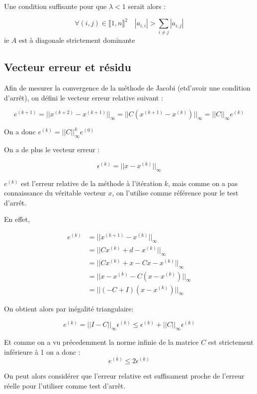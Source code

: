 \documentclass[11pt, a4paper]{article}
\begin{document}
Une condition suffisante pour que $\lambda < 1$ serait alors :

\[
\forall (i,j) \in \llbracket 1,n \rrbracket^2 \quad |a_{i,i}| > \sum_{i \neq j}|a_{i,j}|
\]
ie $A$ est à diagonale strictement dominante

\newpage 

\subsection{Vecteur erreur et résidu}

Afin de mesurer la convergence de la méthode de Jacobi (etd'avoir une condition d'arr\^et), on défini le vecteur erreur relative suivant :

\[
e^{(k+1)} = ||x^{(k+2)} - x^{(k+1)}||_{\infty} = ||C(x^{(k+1)} - x^{(k)})||_{\infty} = ||C||_{\infty}e^{(k)}
\]

On a donc $e^{(k)} = ||C||_{\infty}^ke^{(0)}$

On a de plus le vecteur erreur :

\[
\epsilon^{(k)} = ||x - x^{(k)}||_{\infty}
\]

$e^{(k)}$ est l'erreur relative de la méthode à l'itération $k$, mais comme on a pas connaissance du véritable vecteur $x$, on l'utilise comme référence pour le test d'arr\^et.

En effet, 

\begin{align*}
    e^{(k)} &= ||x^{(k+1)} - x^{(k)}||_{\infty}\\
    &= ||Cx^{(k)} + d - x^{(k)}||_{\infty}\\
    &= ||Cx^{(k)} + x - Cx - x^{(k)}||_{\infty}\\
    &= ||x - x^{(k)} - C(x - x^{(k)})||_{\infty}\\
    &= ||(-C + I)(x - x^{(k)})||_{\infty}
\end{align*}

On obtient alors par inégalité triangulaire: 

\[
e^{(k)} = ||I - C||_{\infty}\epsilon^{(k)} \leq \epsilon^{(k)} + ||C||_{\infty}\epsilon^{(k)}
\]

Et comme on a vu précedemment la norme infinie de la matrice $C$ est strictement inférieure à 1 on a donc :
\[
e^{(k)} \leq 2\epsilon^{(k)}
\]

On peut alors considérer que l'erreur relative est suffisament proche de l'erreur réelle pour l'utiliser comme test d'arr\^et.

\newpage
\end{document}
